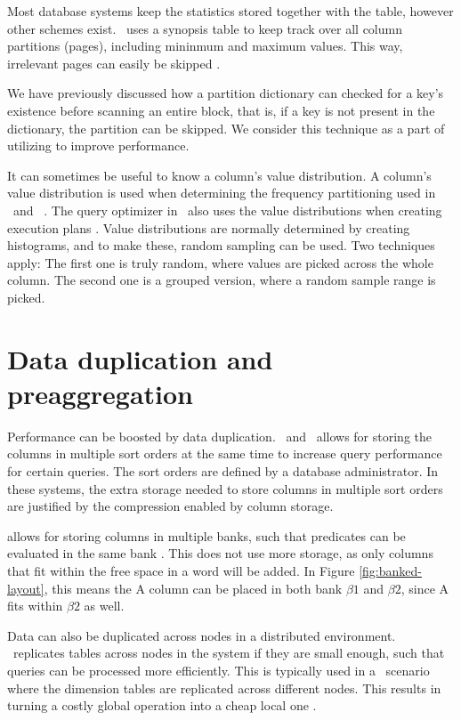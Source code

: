 Most database systems keep the statistics stored together with the table, however other schemes exist. \ibm~uses a synopsis table to keep track over all column partitions (pages), including mininmum and maximum values. This way, irrelevant pages can easily be skipped \cite{Raman2013-em}.

We have previously discussed how a partition dictionary can checked for a key's existence before scanning an entire block, that is, if a key is not present in the dictionary, the partition can be skipped. We consider this technique as a part of utilizing  to improve performance.

It can sometimes be useful to know a column's value distribution. A column's value distribution is used when determining the frequency partitioning used in \blink~and \ibm~\cite{Raman2008-gi, Raman2013-em}. The query optimizer in \mssql~also uses the value distributions when creating execution plans \cite{Larson2013-mc}. Value distributions are normally determined by creating histograms, and to make these, random sampling can be used. Two techniques apply: The first one is truly random, where values are picked across the whole column. The second one is a grouped version, where a random sample range is picked.

\section{Data duplication and preaggregation}
\label{sec:Data duplication and preaggregation}
Performance can be boosted by data duplication. \cstore~and \vertica~allows for storing the columns in multiple sort orders at the same time \cite{Stonebraker2005-qz, Lamb2012-kg} to increase query performance for certain queries. The sort orders are defined by a database administrator. In these systems, the extra storage needed to store columns in multiple sort orders are justified by the compression enabled by column storage.

\blink allows for storing columns in multiple banks, such that predicates can be evaluated in the same bank \cite{Johnson2008-cp}. This does not use more storage, as only columns that fit within the free space in a word will be added. In Figure \ref{fig:banked-layout}, this means the A column can be placed in both bank $\beta 1$ and $\beta 2$, since A fits within $\beta 2$ as well.

Data can also be duplicated across nodes in a distributed environment. \exasol~replicates tables across nodes in the system if they are small enough, such that queries can be processed more efficiently. This is typically used in a \bi~scenario where the dimension tables are replicated across different nodes. This results in turning a costly global operation into a cheap local one \cite{Exasol2014-xh}.


